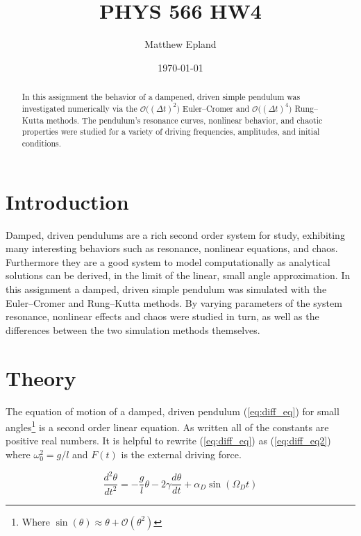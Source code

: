 \documentclass[notitlepage,aps,prd,nofootinbib]{revtex4-1}
\DeclareRobustCommand{\orderof}{\ensuremath{\mathcal{O}}}
\begin{document}
\title{PHYS 566 HW4}
\author{Matthew Epland}

\date{\today}

\begin{abstract}
In this assignment the behavior of a dampened, driven simple pendulum was investigated numerically via the $\orderof\big(\left(\Delta t\right)^2\big)$ Euler--Cromer and $\orderof\big(\left(\Delta t\right)^4\big)$ Rung--Kutta methods. The pendulum's resonance curves, nonlinear behavior, and chaotic properties were studied for a variety of driving frequencies, amplitudes, and initial conditions.
\end{abstract}\maketitle


\section{Introduction}
\label{sec:intro}
Damped, driven pendulums are a rich second order system for study, exhibiting many interesting behaviors such as resonance, nonlinear equations, and chaos. Furthermore they are a good system to model computationally as analytical solutions can be derived, in the limit of the linear, small angle approximation. In this assignment a damped, driven simple pendulum was simulated with the Euler--Cromer and Rung--Kutta methods. By varying parameters of the system resonance, nonlinear effects and chaos were studied in turn, as well as the differences between the two simulation methods themselves.

\section{Theory}
\label{sec:theory}
The equation of motion of a damped, driven pendulum (\ref{eq:diff_eq}) for small angles\footnote{Where $\sin\left(\theta\right) \approx \theta + \orderof\left(\theta^2\right)$} is a second order linear equation. As written all of the constants are positive real numbers. It is helpful to rewrite (\ref{eq:diff_eq}) as (\ref{eq:diff_eq2}) where $\omega_{0}^2 = g/l$ and $F\left(t\right)$ is the external driving force.

\begin{equation} \label{eq:diff_eq}
\frac{d^2 \theta}{d t^2} = -\frac{g}{l}\theta - 2\gamma\frac{d \theta}{d t} + \alpha_{D}\sin\left(\Omega_{D} t\right)
\end{equation}
\end{document}
